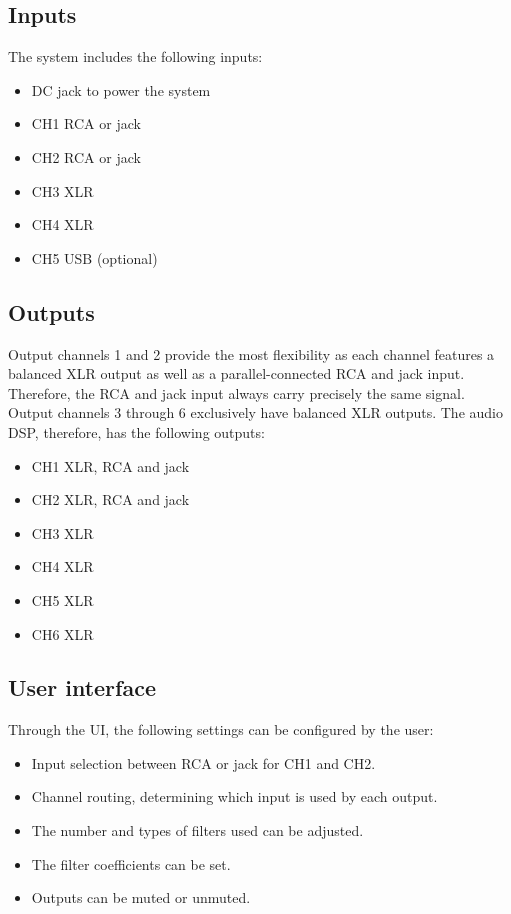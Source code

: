 \subsection{Inputs}
The system includes the following inputs:
\begin{itemize}
    \item DC jack to power the system
    \item CH1 RCA or jack
    \item CH2 RCA or jack
    \item CH3 XLR
    \item CH4 XLR
    \item CH5 USB (optional)
\end{itemize}

\subsection{Outputs}
Output channels 1 and 2 provide the most flexibility as each channel features a balanced XLR output as well as a parallel-connected RCA and jack input. Therefore, the RCA and jack input always carry precisely the same signal. Output channels 3 through 6 exclusively have balanced XLR outputs. The audio DSP, therefore, has the following outputs:

\begin{itemize}
    \item CH1 XLR, RCA and jack
    \item CH2 XLR, RCA and jack
    \item CH3 XLR
    \item CH4 XLR
    \item CH5 XLR
    \item CH6 XLR
\end{itemize}

\subsection{User interface}
Through the UI, the following settings can be configured by the user:
\begin{itemize}
    \item Input selection between RCA or jack for CH1 and CH2.
    \item Channel routing, determining which input is used by each output.
    \item The number and types of filters used can be adjusted.
    \item The filter coefficients can be set.
    \item Outputs can be muted or unmuted.
\end{itemize}

